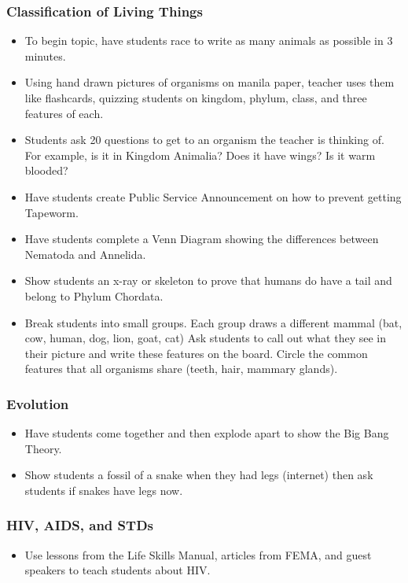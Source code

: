 \subsubsection{Classification of Living Things}
\begin{itemize}
\item To begin topic, have students race to write as many animals as possible in 3 minutes.
\item	Using hand drawn pictures of organisms on manila paper, teacher uses them like flashcards, quizzing students on kingdom, phylum, class, and three features of each.
\item	Students ask 20 questions to get to an organism the teacher is thinking of.  For example, is it in Kingdom Animalia? Does it have wings? Is it warm blooded? 
\item Have students create Public Service Announcement on how to prevent getting Tapeworm.
\item Have students complete a Venn Diagram showing the differences between Nematoda and Annelida.
\item Show students an x-ray or skeleton to prove that humans do have a tail and belong to Phylum Chordata.
\item Break students into small groups.  Each group draws a different mammal (bat, cow, human, dog, lion, goat, cat) Ask students to call out what they see in their picture and write these features on the board.  Circle the common features that all organisms share (teeth, hair, mammary glands).
\end{itemize}

\subsubsection{Evolution}
\begin{itemize}
\item Have students come together and then explode apart to show the Big Bang Theory.
\item Show students a fossil of a snake when they had legs (internet) then ask students if snakes have legs now. 
\end{itemize}

\subsubsection{HIV, AIDS, and STDs}
\begin{itemize}
\item Use lessons from the Life Skills Manual, articles from FEMA, and guest speakers to teach students about HIV.
\end{itemize}
